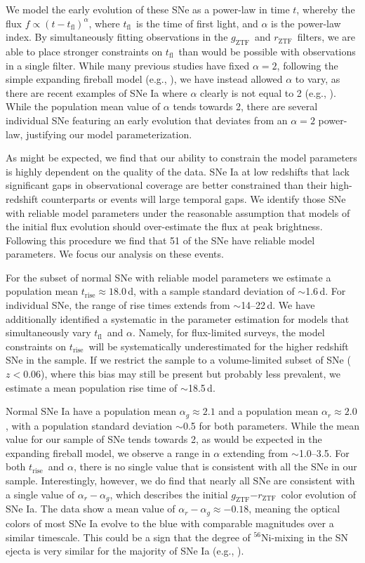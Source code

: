 \documentclass[twocolumn]{aastex63}
\newcommand{\rztf}{$r_\mathrm{ZTF}$}
\newcommand{\gztf}{$g_\mathrm{ZTF}$}
\newcommand{\tfl}{$t_\mathrm{fl}$}
\newcommand{\trise}{$t_\mathrm{rise}$}
\begin{document}
We model the early evolution of these SNe as a power-law in time $t$, whereby
the flux $f \propto (t - t_\mathrm{fl})^\alpha$, where \tfl\ is the time of
first light, and $\alpha$ is the power-law index. By simultaneously fitting
observations in the \gztf\ and \rztf\ filters, we are able to place stronger
constraints on \tfl\ than would be possible with observations in a single
filter. While many previous studies have fixed $\alpha = 2$, following the
simple expanding fireball model (e.g., \citealt{Riess99a}), we have instead
allowed $\alpha$ to vary, as there are recent examples of SNe Ia where
$\alpha$ clearly is not equal to 2 (e.g.,
\citealt{Zheng13,Miller18,Shappee19,Dimitriadis19}). While the population mean
value of $\alpha$ tends towards 2, there are several individual SNe featuring
an early evolution that deviates from an $\alpha = 2$ power-law, justifying
our model parameterization.

As might be expected, we find that our ability to constrain the model
parameters is highly dependent on the quality of the data. SNe Ia at low
redshifts that lack significant gaps in observational coverage are better
constrained than their high-redshift counterparts or events will large
temporal gaps. We identify those SNe with reliable model parameters under the
reasonable assumption that models of the initial flux evolution should
over-estimate the flux at peak brightness. Following this procedure we find
that 51 of the SNe have reliable model parameters. We focus our analysis on
these events.

For the subset of normal SNe with reliable model parameters we estimate a
population mean \trise\;$\approx 18.0$\,d, with a sample standard deviation of
$\sim$1.6\,d. For individual SNe, the range of rise times extends from
$\sim$14--22\,d. We have additionally identified a systematic in the parameter
estimation for models that simultaneously vary \tfl\ and $\alpha$. Namely, for
flux-limited surveys, the model constraints on \trise\ will be systematically
underestimated for the higher redshift SNe in the sample. If we restrict the
sample to a volume-limited subset of SNe ($z < 0.06$), where this bias may
still be present but probably less prevalent, we estimate a mean population
rise time of $\sim$18.5\,d.

Normal SNe Ia have a population mean $\alpha_g \approx 2.1$ and a population
mean $\alpha_r \approx 2.0$, with a population standard deviation $\sim$0.5
for both parameters. While the mean value for our sample of SNe tends towards
2, as would be expected in the expanding fireball model, we observe a range in
$\alpha$ extending from $\sim$1.0--3.5. For both \trise\ and $\alpha$, there
is no single value that is consistent with all the SNe in our sample.
Interestingly, however, we do find that nearly all SNe are consistent with a
single value of $\alpha_r - \alpha_g$, which describes the initial \gztf$ -
$\rztf\ color evolution of SNe Ia. The data show a mean value of $\alpha_r -
\alpha_g \approx -0.18$, meaning the optical colors of most SNe Ia evolve to
the blue with comparable magnitudes over a similar timescale. This could be a
sign that the degree of $^{56}$Ni-mixing in the SN ejecta is very similar for
the majority of SNe Ia (e.g., \citealt{Piro16,Magee18,Magee19}).
\end{document}

